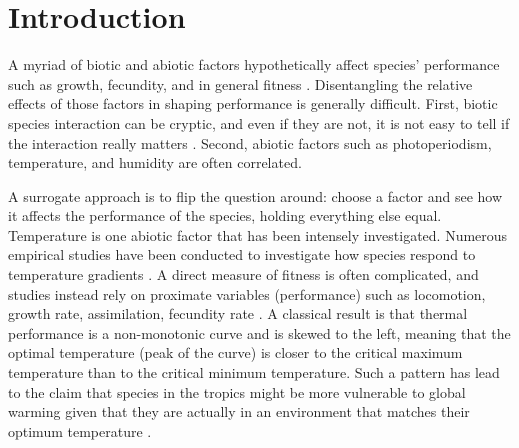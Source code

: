 \section*{Introduction}
A myriad of biotic and abiotic factors  hypothetically affect species' performance such as growth, fecundity, and in general fitness \citep{Krebs2000}.
Disentangling the relative effects of those factors in shaping performance is generally difficult.
First, biotic species interaction can be cryptic, and even if they are not, it is not easy to tell if the interaction really matters \citep{Morales2015}. %
Second, abiotic factors such as photoperiodism, temperature, and humidity are often correlated.
 
A surrogate approach is to flip the question around: choose a factor and see how it affects the performance of the species, holding everything else equal.
Temperature is one abiotic factor that has been intensely investigated.
Numerous empirical studies have been conducted to investigate how species respond to temperature gradients \citep[e.g.,][]{Angilletta2009}.
A direct measure of fitness is often complicated, and studies instead rely on proximate variables (performance) such as locomotion, growth rate, assimilation, fecundity rate \citep[][and references therein]{Angilletta2009}. %
A classical result is that thermal performance is a non-monotonic curve and is skewed to the left, meaning that the optimal temperature (peak of the curve) is closer to the critical maximum temperature than to the critical minimum temperature. 
Such a pattern has lead to the claim that species in the tropics might be more vulnerable to global warming given that they are actually in an environment that matches their optimum temperature \citep{Deutsch2008}. %

